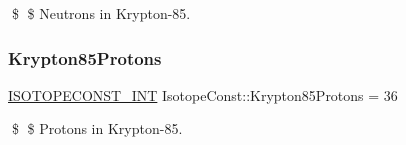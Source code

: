\$ \$ Neutrons in Krypton-\/85. \mbox{\label{group___isotope_const-_krypton-_kr85_ga2e9ef6b4bf318b1a42db2a2d078e0736}} 
\subsubsection{\texorpdfstring{Krypton85\+Protons}{Krypton85Protons}}
{\footnotesize\ttfamily \mbox{\hyperlink{group___isotope_const-_macros_ga5f18360b3e99483a35c32d789e62621c}{I\+S\+O\+T\+O\+P\+E\+C\+O\+N\+S\+T\+\_\+\+I\+NT}} Isotope\+Const\+::\+Krypton85\+Protons = 36}

\$ \$ Protons in Krypton-\/85. 
